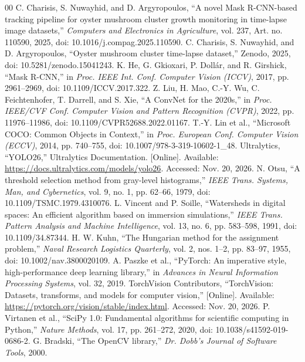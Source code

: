 \documentclass[11pt,a4paper]{article}
\begin{document}
\begin{thebibliography}{00}
 C. Charisis, S. Nuwayhid, and D. Argyropoulos, ``A novel Mask R-CNN-based tracking pipeline for oyster mushroom cluster growth monitoring in time-lapse image datasets,'' \emph{Computers and Electronics in Agriculture}, vol. 237, Art. no. 110590, 2025, doi: 10.1016/j.compag.2025.110590.
 C. Charisis, S. Nuwayhid, and D. Argyropoulos, ``Oyster mushroom cluster time-lapse dataset,'' Zenodo, 2025, doi: 10.5281/zenodo.15041243.
 K. He, G. Gkioxari, P. Doll\'ar, and R. Girshick, ``Mask R-CNN,'' in \emph{Proc. IEEE Int. Conf. Computer Vision (ICCV)}, 2017, pp. 2961--2969, doi: 10.1109/ICCV.2017.322.
 Z. Liu, H. Mao, C.-Y. Wu, C. Feichtenhofer, T. Darrell, and S. Xie, ``A ConvNet for the 2020s,'' in \emph{Proc. IEEE/CVF Conf. Computer Vision and Pattern Recognition (CVPR)}, 2022, pp. 11976--11986, doi: 10.1109/CVPR52688.2022.01167.
 T.-Y. Lin et al., ``Microsoft COCO: Common Objects in Context,'' in \emph{Proc. European Conf. Computer Vision (ECCV)}, 2014, pp. 740--755, doi: 10.1007/978-3-319-10602-1\_48.
 Ultralytics, ``YOLO26,'' Ultralytics Documentation. [Online]. Available: \url{https://docs.ultralytics.com/models/yolo26}. Accessed: Nov. 20, 2026.
 N. Otsu, ``A threshold selection method from gray-level histograms,'' \emph{IEEE Trans. Systems, Man, and Cybernetics}, vol. 9, no. 1, pp. 62--66, 1979, doi: 10.1109/TSMC.1979.4310076.
 L. Vincent and P. Soille, ``Watersheds in digital spaces: An efficient algorithm based on immersion simulations,'' \emph{IEEE Trans. Pattern Analysis and Machine Intelligence}, vol. 13, no. 6, pp. 583--598, 1991, doi: 10.1109/34.87344.
 H. W. Kuhn, ``The Hungarian method for the assignment problem,'' \emph{Naval Research Logistics Quarterly}, vol. 2, nos. 1--2, pp. 83--97, 1955, doi: 10.1002/nav.3800020109.
 A. Paszke et al., ``PyTorch: An imperative style, high-performance deep learning library,'' in \emph{Advances in Neural Information Processing Systems}, vol. 32, 2019.
 TorchVision Contributors, ``TorchVision: Datasets, transforms, and models for computer vision,'' [Online]. Available: \url{https://pytorch.org/vision/stable/index.html}. Accessed: Nov. 20, 2026.
 P. Virtanen et al., ``SciPy 1.0: Fundamental algorithms for scientific computing in Python,'' \emph{Nature Methods}, vol. 17, pp. 261--272, 2020, doi: 10.1038/s41592-019-0686-2.
 G. Bradski, ``The OpenCV library,'' \emph{Dr. Dobb's Journal of Software Tools}, 2000.
\end{thebibliography}
\end{document}
